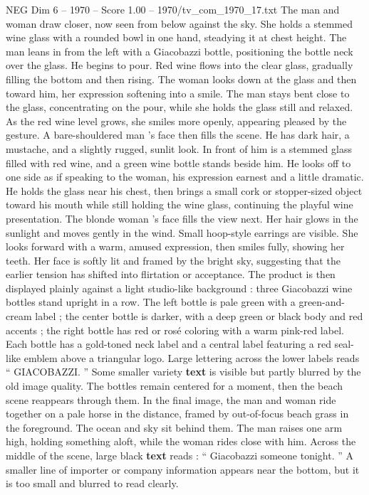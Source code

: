 \begin{textsample}{NEG Dim 6 – 1970 – Score 1.00 – 1970/tv\_com\_1970\_17.txt}
The man and woman draw closer, now seen from below against the sky.
She holds a stemmed wine glass with a rounded bowl in one hand, steadying it at chest height.
The man leans in from the left with a Giacobazzi bottle, positioning the bottle neck over the glass.
He begins to pour.
Red wine flows into the clear glass, gradually filling the bottom and then rising.
The woman looks down at the glass and then toward him, her expression softening into a smile.
The man stays bent close to the glass, concentrating on the pour, while she holds the glass still and relaxed.
As the red wine level grows, she smiles more openly, appearing pleased by the gesture.
A bare-shouldered man ’s face then fills the scene.
He has dark hair, a mustache, and a slightly rugged, sunlit look.
In front of him is a stemmed glass filled with red wine, and a green wine bottle stands beside him.
He looks off to one side as if speaking to the woman, his expression earnest and a little dramatic.
He holds the glass near his chest, then brings a small cork or stopper-sized object toward his mouth while still holding the wine glass, continuing the playful wine presentation.
The blonde woman ’s face fills the view next.
Her hair glows in the sunlight and moves gently in the wind.
Small hoop-style earrings are visible.
She looks forward with a warm, amused expression, then smiles fully, showing her teeth.
Her face is softly lit and framed by the bright sky, suggesting that the earlier tension has shifted into flirtation or acceptance.
The product is then displayed plainly against a light studio-like background : three Giacobazzi wine bottles stand upright in a row.
The left bottle is pale green with a green-and-cream label ; the center bottle is darker, with a deep green or black body and red accents ; the right bottle has red or rosé coloring with a warm pink-red label.
Each bottle has a gold-toned neck label and a central label featuring a red seal-like emblem above a triangular logo.
Large lettering across the lower labels reads “ GIACOBAZZI. ” Some smaller variety \textbf{text} is visible but partly blurred by the old image quality.
The bottles remain centered for a moment, then the beach scene reappears through them.
In the final image, the man and woman ride together on a pale horse in the distance, framed by out-of-focus beach grass in the foreground.
The ocean and sky sit behind them.
The man raises one arm high, holding something aloft, while the woman rides close with him.
Across the middle of the scene, large black \textbf{text} reads : “ Giacobazzi someone tonight. ” A smaller line of importer or company information appears near the bottom, but it is too small and blurred to read clearly.

\end{textsample}
